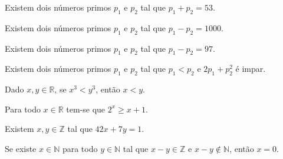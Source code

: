 \begin{exerList}
	\item Existem dois números primos $p_1$ e $p_2$ tal que $p_1 + p_2 = 53$.
	\item Existem dois números primos $p_1$ e $p_2$ tal que $p_1 - p_2 = 1000$.
	\item Existem dois números primos $p_1$ e $p_2$ tal que $p_1 - p_2 = 97$.
	\item Existem dois números primos $p_1$ e $p_2$ tal que $p_1 < p_2$ e $2p_1 + p_2^2$ é impar.
	\item Dado $x, y \in \mathbb{R}$, se $x^3 < y^3$, então $x < y$.
	\item Para todo $x \in \mathbb{R}$ tem-se que $2^x \geq x + 1$.
	\item Existem $x, y \in \mathbb{Z}$ tal que $42x + 7y = 1$.
	\item Se existe $x \in \mathbb{N}$ para todo $y \in \mathbb{N}$ tal que $x - y \in \mathbb{Z}$ e $x - y \notin \mathbb{N}$, então $x = 0$.
\end{exerList}




